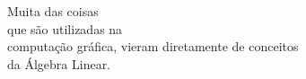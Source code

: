 \documentclass[preview]{standalone}
\begin{document}
\begin{center}
Muita das coisas\\que são utilizadas na\\computação gráfica, vieram diretamente de conceitos\\da Álgebra Linear.
\end{center}
\end{document}
